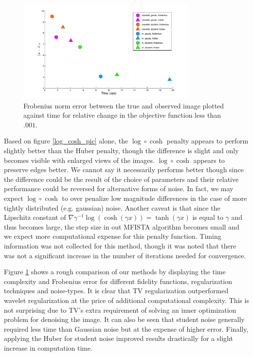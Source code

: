 \documentclass[10pt,a4paper]{article}
\begin{document}
	\begin{figure}[t]
		
		\begin{center}
			\includegraphics[width=0.8\textwidth]{../figures/comparePlot2.pdf}
			\caption{ Frobenius norm error between the true and observed image plotted against time for relative change in the objective function less than $.001$. }
			\label{comp_methods}
		\end{center}
	\end{figure}

	
	Based on figure \ref{log_cosh_pic} alone, the $\log \circ \cosh$ penalty appears to perform slightly better than the Huber penalty, though the difference is slight and only becomes visible with enlarged views of the images.  $\log \circ \cosh$ appears to preserve edges better.  We cannot say it necessarily performs better though since the difference could be the result of the choice of parameters and their relative performance could be reversed for alternative forms of noise.  In fact, we may expect $\log \circ \cosh$ to over penalize low magnitude differences in the case of more tightly distributed (e.g. gaussian) noise.  Another caveat is that since the Lipschitz constant of $\nabla \gamma^{-1} \log ( \cosh ( \gamma x )) = \tanh (\gamma x)$ is equal to $\gamma$ and thus becomes large, the step size in out MFISTA algorithm becomes small and we expect more computational expense for this penalty function.  Timing information was not collected for this method, though it was noted that there was not a significant increase in the number of iterations needed for convergence.
	
		
	Figure \ref{comp_methods} shows a rough comparison of our methods by displaying the time complexity and Frobenius error for different fidelity functions, regularization techniques and noise-types. It is clear that TV regularization outperformed wavelet regularization at the price of additional computational complexity. This is not surprising due to TV's extra requirement of solving an inner optimization problem for denoising the image. It can also be seen that student noise generally required less time than Gaussian noise but at the expense of higher error. Finally, applying the Huber for student noise improved results drastically for a slight increase in computation time.  
	
\end{document}
